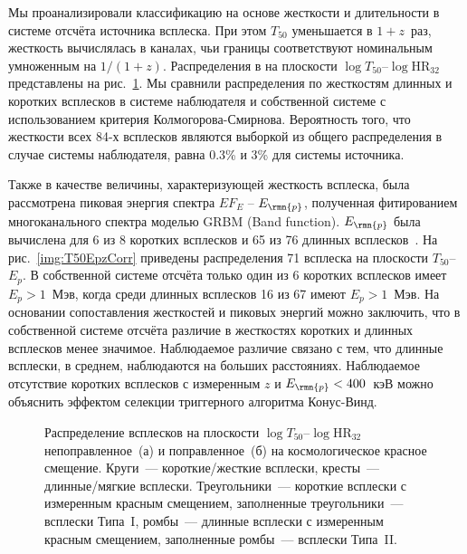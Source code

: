 Мы проанализировали классификацию на основе жесткости и длительности в системе 
отсчёта источника всплеска. При этом $T_{50}$ уменьшается в $1+z$~раз, жесткость 
вычислялась в каналах, чьи границы соответствуют номинальным умноженным на $1/(1+z)$. 
Распределения в на плоскости $\log T_{50}$--$\log \mbox{HR}_{32}$ представлены на 
рис.~\ref{img:T50HRzCorr}.  Мы сравнили распределения по жесткостям длинных и 
коротких всплесков в системе наблюдателя и собственной системе с использованием 
критерия Колмогорова-Смирнова. Вероятность того, что жесткости всех 84-х всплесков 
являются выборкой из общего распределения в случае системы наблюдателя, 
равна 0.3\% и 3\% для системы источника.  

Также в качестве величины, характеризующей жесткость всплеска, была рассмотрена 
пиковая энергия спектра $E F_E$ -- $E_{\rmn{p}}$, полученная фитированием многоканального 
спектра моделью GRBM (Band function). $E_{\rmn{p}}$ была вычислена для 6 из 8 коротких 
всплесков и 65 из 76 длинных всплесков~\citep{Tsvetkova_2014}. На рис.~\ref{img:T50EpzCorr} 
приведены распределения 71 всплеска на плоскости $T_{50}$--$E_p$. В собственной системе 
отсчёта только один из 6 коротких всплесков имеет $E_p > 1$~Мэв, когда среди длинных 
всплесков 16 из 67 имеют $E_p > 1$~Мэв. На основании сопоставления жесткостей 
и пиковых энергий можно заключить, что в собственной системе отсчёта 
различие в жесткостях коротких и длинных всплесков менее значимое. Наблюдаемое 
различие связано с тем, что длинные всплески, в среднем, наблюдаются на больших 
расстояниях. Наблюдаемое отсутствие коротких всплесков с измеренным $z$ 
и $E_{\rmn{p}} <400$~кэВ можно объяснить эффектом селекции триггерного алгоритма Конус-Винд. 

\begin{figure}[h]
  \begin{minipage}[h]{0.5\textwidth}
  \end{minipage}
  \hfill
  \begin{minipage}[h]{0.5\textwidth}
  \end{minipage}
  \caption{Распределение всплесков на плоскости $\log T_{50}$--$\log \mbox{HR}_{32}$ 
  непоправленное~(а) и поправленное~(б) на космологическое красное смещение. 
  Круги~--- короткие/жесткие всплески, кресты~--- длинные/мягкие всплески. 
  Треугольники~--- короткие всплески с измеренным красным смещением, 
  заполненные треугольники~--- всплески Типа~I, ромбы~--- длинные всплески с 
  измеренным красным смещением, заполненные ромбы~--- всплески Типа~II.}
  \label{img:T50HRzCorr}  
\end{figure}

